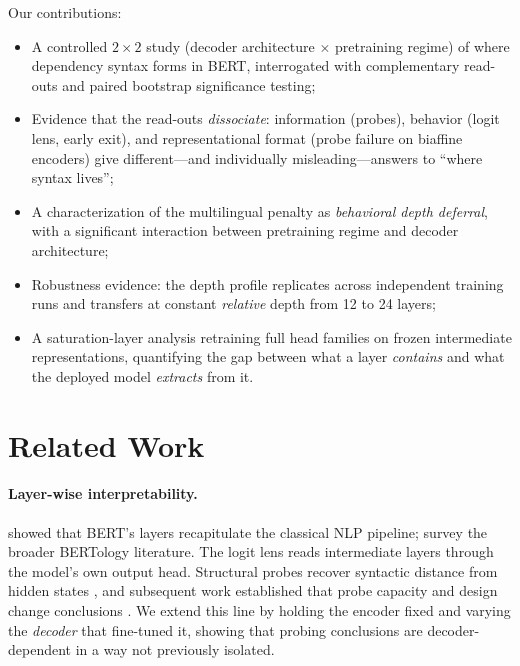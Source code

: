 \documentclass[letterpaper]{article}
\begin{document}
Our contributions:
\begin{itemize}
\item A controlled $2\times2$ study (decoder architecture $\times$ pretraining
  regime) of where dependency syntax forms in BERT, interrogated with
  complementary read-outs and paired bootstrap significance testing;
\item Evidence that the read-outs \emph{dissociate}: information (probes),
  behavior (logit lens, early exit), and representational format (probe
  failure on biaffine encoders) give different---and individually
  misleading---answers to ``where syntax lives'';
\item A characterization of the multilingual penalty as \emph{behavioral depth
  deferral}, with a significant interaction between pretraining regime and
  decoder architecture;
\item Robustness evidence: the depth profile replicates across independent
  training runs and transfers at constant \emph{relative} depth from 12 to 24
  layers;
\item A saturation-layer analysis retraining full head families on frozen
  intermediate representations, quantifying the gap between what a layer
  \emph{contains} and what the deployed model \emph{extracts} from it.
\end{itemize}

\section{Related Work}

\paragraph{Layer-wise interpretability.}
\citet{tenney2019bert} showed that BERT's layers recapitulate the classical
NLP pipeline; \citet{rogers2020primer} survey the broader BERTology
literature. The logit lens \cite{nostalgebraist2020logitlens} reads
intermediate layers through the model's own output head. Structural probes
recover syntactic distance from hidden states \cite{hewitt2019structural},
and subsequent work established that probe capacity and design change
conclusions \cite{hewitt2019control,voita2020information,belinkov2022probing}.
We extend this line by holding the encoder fixed and varying the
\emph{decoder} that fine-tuned it, showing that probing conclusions are
decoder-dependent in a way not previously isolated.
\end{document}
